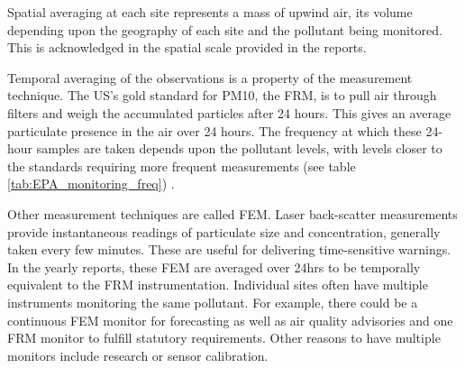 Spatial averaging at each site represents a mass of upwind air, its volume depending upon the geography of each site and the pollutant being monitored.  This is acknowledged in the spatial scale provided in the reports.   

Temporal averaging of the observations is a property of the measurement technique.  The US's gold standard for PM10, the FRM, is to pull air through filters and weigh the accumulated particles after 24 hours.  This gives an average particulate presence in the air over 24 hours.  The frequency at which these 24-hour samples are taken depends upon the pollutant levels, with levels closer to the standards requiring more frequent measurements (see table \ref{tab:EPA_monitoring_freq}) 
\citep{CASCAQMD:2015}.

Other measurement techniques are called FEM.  Laser back-scatter measurements provide instantaneous readings of particulate size and concentration, generally taken every few minutes.  These are useful for delivering time-sensitive warnings.  In the yearly reports, these FEM are averaged over 24hrs to be temporally equivalent to the FRM instrumentation.
Individual sites often have multiple instruments monitoring the same pollutant. For example, there could be a continuous FEM monitor for forecasting as well as air quality advisories and one FRM monitor to fulfill statutory requirements.  Other reasons to have multiple monitors include research or sensor calibration. 

